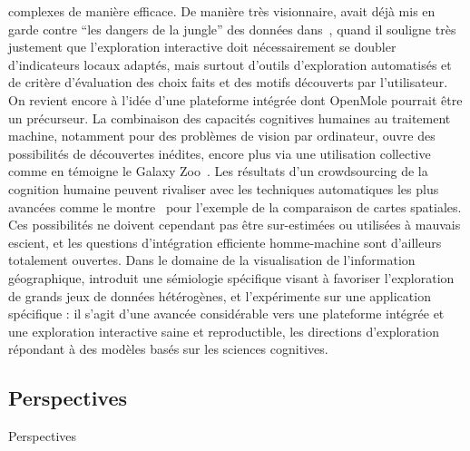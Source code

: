 complexes de manière efficace. De manière très visionnaire,  avait déjà mis en garde contre ``les dangers de la jungle'' des données dans~\cite{banos2001propos}, quand il souligne très justement que l'exploration interactive doit nécessairement se doubler d'indicateurs locaux adaptés, mais surtout d'outils d'exploration automatisés et de critère d'évaluation des choix faits et des motifs découverts par l'utilisateur. On revient encore à l'idée d'une plateforme intégrée dont OpenMole pourrait être un précurseur. La combinaison des capacités cognitives humaines au traitement machine, notamment pour des problèmes de vision par ordinateur, ouvre des possibilités de découvertes inédites, encore plus via une utilisation collective comme en témoigne le Galaxy Zoo~\cite{2010AEdRv...9a0103R}. Les résultats d'un crowdsourcing de la cognition humaine peuvent rivaliser avec les techniques automatiques les plus avancées comme le montre~\cite{10.1371/journal.pone.0178165} pour l'exemple de la comparaison de cartes spatiales. Ces possibilités ne doivent cependant pas être sur-estimées ou utilisées à mauvais escient, et les questions d'intégration efficiente homme-machine sont d'ailleurs totalement ouvertes. Dans le domaine de la visualisation de l'information géographique, \cite{pfaender2009spatialisation} introduit une sémiologie spécifique visant à favoriser l'exploration de grands jeux de données hétérogènes, et l'expérimente sur une application spécifique : il s'agit d'une avancée considérable vers une plateforme intégrée et une exploration interactive saine et reproductible, les directions d'exploration répondant à des modèles basés sur les sciences cognitives. 






\subsection{Perspectives}{Perspectives}


